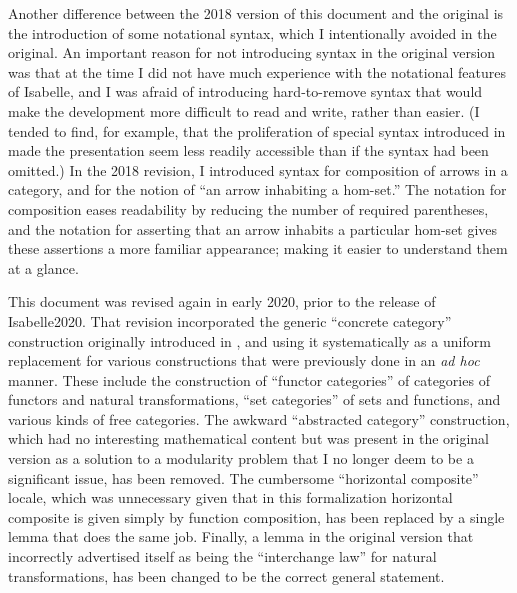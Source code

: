 \documentclass[11pt,notitlepage,a4paper]{report}
\begin{document}
Another difference between the 2018 version of this document and the original is the
introduction of some notational syntax, which I intentionally avoided in the original.
An important reason for not introducing syntax in the original version was that at the time
I did not have much experience with the notational features of Isabelle, and I was afraid
of introducing hard-to-remove syntax that would make the development more difficult to read
and write, rather than easier.  (I tended to find, for example, that the proliferation of
special syntax introduced in \cite{Katovsky-AFP10} made the presentation seem less readily
accessible than if the syntax had been omitted.)  In the 2018 revision, I introduced
syntax for composition of arrows in a category, and for the notion of ``an arrow inhabiting
a hom-set.''  The notation for composition eases readability by reducing the number of
required parentheses, and the notation for asserting that an arrow inhabits a particular
hom-set gives these assertions a more familiar appearance; making it easier to understand
them at a glance.

This document was revised again in early 2020, prior to the release of Isabelle2020.
That revision incorporated the generic ``concrete category'' construction originally
introduced in \cite{Bicategory-AFP}, and using it systematically as a uniform replacement
for various constructions that were previously done in an {\em ad hoc} manner.
These include the construction of
``functor categories'' of categories of functors and natural transformations,
``set categories'' of sets and functions, and various kinds of free categories.
The awkward ``abstracted category'' construction, which had no interesting mathematical
content but was present in the original version as a solution to a modularity problem that
I no longer deem to be a significant issue, has been removed.
The cumbersome ``horizontal composite'' locale, which was unnecessary given that in this
formalization horizontal composite is given simply by function composition,
has been replaced by a single lemma that does the same job.
Finally, a lemma in the original version that incorrectly advertised itself as being
the ``interchange law'' for natural transformations, has been changed to be the
correct general statement.
\end{document}
